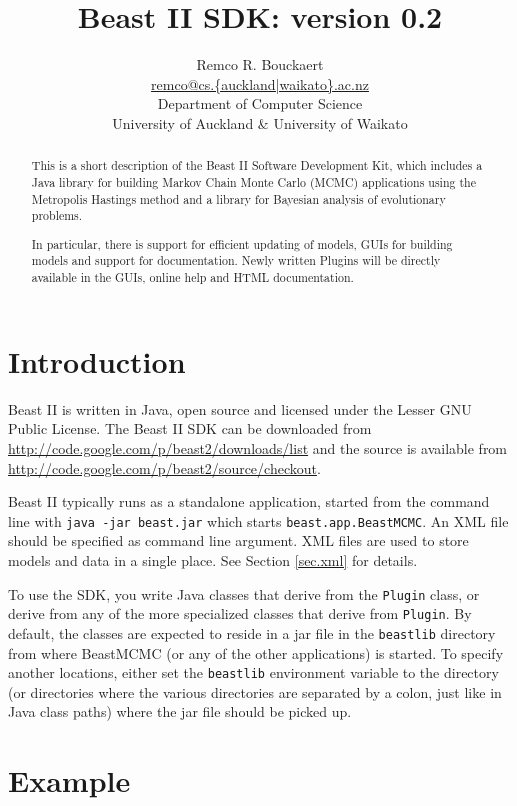 \documentclass{article}
\title{Beast II SDK: version 0.2}
\author{Remco R. Bouckaert\\\url{remco@cs.{auckland|waikato}.ac.nz}\\
  Department of Computer Science\\
  University of Auckland \& University of Waikato
}
\begin{document}
\maketitle
\begin{abstract}
This is a short description of the Beast II Software Development Kit,
which includes a Java library for building Markov Chain Monte Carlo (MCMC) 
applications using the Metropolis Hastings method and a library for
Bayesian analysis of evolutionary problems.

In particular, there is support for efficient updating of models,
GUIs for building models and support for documentation. Newly written Plugins 
will be directly available in the GUIs, online help and HTML documentation.
\end{abstract}


\section{Introduction}

Beast II is written in Java, open source and licensed under the Lesser GNU Public License.
The Beast II SDK can be downloaded from \url{http://code.google.com/p/beast2/downloads/list}
and the source is available from \url{http://code.google.com/p/beast2/source/checkout}.

Beast II typically runs as a standalone application, started from the command line with
{\tt java -jar beast.jar} which starts {\tt beast.app.BeastMCMC}.
An XML file should be specified as command line argument. XML files are used to
store models and data in a single place. See Section \ref{sec.xml} for details.

To use the SDK, you write Java classes that derive from the {\tt Plugin} class, or derive
from any of the more specialized classes that derive from {\tt Plugin}. By default,
the classes are expected to reside in a jar file in the {\tt beastlib} directory
from where BeastMCMC (or any of the other applications) is started. To specify another
locations, either set the {\tt beastlib} environment variable to the directory (or
directories where the various directories are separated by a colon, just like in Java
class paths) where the jar file should be picked up.


\section{Example\label{sec.example}}
\end{document}
